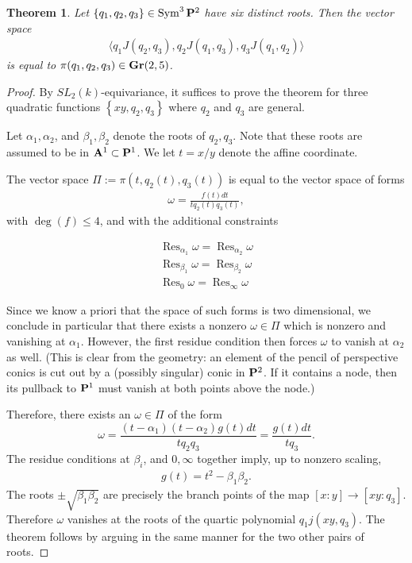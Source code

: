 \documentclass[11pt,reqno]{amsart}
\theoremstyle{plain}
\newtheorem{theorem}{Theorem}[section]
\theoremstyle{definition}
\theoremstyle{remark}
\numberwithin{equation}{section}
\DeclareMathOperator{\res}{Res}
\renewcommand{\to}{{\longrightarrow}}
\numberwithin{equation}{section}
\begin{document}
\begin{theorem}
  \label{theorem:onlyapencil}
  Let $\left\{ q_{1},q_{2},q_{3} \right\} \in \Sym^{3}\P^{2}$ have six distinct roots. Then the vector space
  \begin{align*}
    \langle q_{1}J(q_{2},q_{3}), q_{2}J(q_{1},q_{3}), q_{3}J(q_{1},q_{2}) \rangle 
  \end{align*}
  is equal to  $\pi(q_{1},q_{2},q_{3}) \in \Gr(2,5)$.
\end{theorem}
\begin{proof}
  By $SL_2(k)$-equivariance, it suffices to prove the theorem for three quadratic functions $\left\{ xy, q_{2}, q_{3} \right\}$ where $q_{2}$ and $q_{3}$ are general.
 
  Let $\alpha_{1}, \alpha_{2}$, and $\beta_{1}, \beta_{2}$ denote the roots of $q_{2}, q_{3}$. Note that these roots are assumed to be in ${\bf A}^{1} \subset \P^{1}$.  We let $t = x/y$ denote the affine coordinate.

  The vector space $\Pi := \pi(t, q_{2}(t), q_{3}(t))$ is equal to the vector space of forms
  \begin{align*}
    \omega = \frac{f(t)dt}{tq_{2}(t)q_{3}(t)},
  \end{align*}
  with $\deg(f) \leq 4$, and with the additional constraints

 \begin{align*}
    \res_{\alpha_{1}}\omega = \res_{ \alpha_{2}} \omega\\
    \res_{\beta_{1}}\omega = \res_{ \beta_{2}} \omega\\
    \res_{0}\omega = \res_{\infty} \omega
  \end{align*}

  Since we know a priori that the space of such forms is two dimensional, we conclude in particular that there exists a nonzero $\omega \in \Pi$ which is nonzero and vanishing at $\alpha_{1}$.  However, the first residue condition then forces $\omega$ to vanish at $\alpha_{2}$ as well. (This is clear from the geometry: an element of the pencil of perspective conics is cut out by a (possibly singular) conic in $\P^{2}$. If it contains a node, then its pullback to $\P^1$ must vanish at both points above the node.)

  Therefore, there exists an $\omega \in \Pi$ of the form $$ \omega = \frac{(t-\alpha_{1})(t-\alpha_{2})g(t)dt}{tq_{2}q_{3}} = \frac{g(t)dt}{tq_{3}}.$$
  The residue conditions at $\beta_{i}$, and $0, \infty$ together imply, up to nonzero scaling,
  \begin{align*}
    g(t) = t^{2} - \beta_{1}\beta_{2}.
  \end{align*}
  The roots $\pm \sqrt{\beta_{1}\beta_{2}}$ are precisely the branch points of the map $[x:y] \to [xy : q_{3}]$.  Therefore $\omega$ vanishes at the roots of the quartic polynomial $q_{1}j(xy,q_{3})$. The theorem follows by arguing in the same manner for the two other pairs of roots.

\end{proof}
\end{document}
